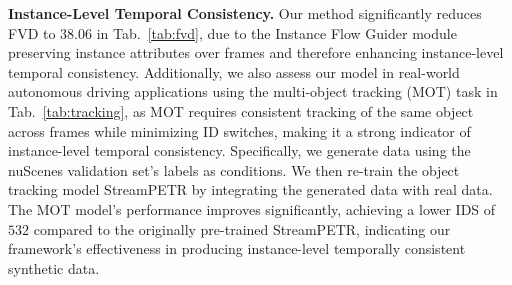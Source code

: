 \noindent\textbf{Instance-Level Temporal Consistency.} 
Our method significantly reduces FVD to $38.06$ in Tab.~\ref{tab:fvd}, due to the Instance Flow Guider module preserving instance attributes over frames and therefore enhancing instance-level temporal consistency.
Additionally, we also assess our model in real-world autonomous driving applications using the multi-object tracking (MOT) task in Tab.~\ref{tab:tracking}, 
as MOT requires consistent tracking of the same object across frames while minimizing ID switches, making it a strong indicator of instance-level temporal consistency.
Specifically, we generate data using the nuScenes validation set’s labels as conditions. 
We then re-train the object tracking model StreamPETR \cite{streampetr} by integrating the generated data with real data.
The MOT model's performance improves significantly, achieving a lower IDS of $532$ compared to the originally pre-trained StreamPETR, indicating %
our framework’s effectiveness in producing instance-level temporally consistent synthetic data.



\begin{table}[htbp]
    \centering
    \footnotesize
        \centering
         \caption{
         Comparison on perception task using the generated nuScenes validation set in (T+I)2V scenarios.
We use pre-trained perception model StreamPETR \cite{streampetr} to evaluate. 
Our model outperformed most baseline models across the board without any post-refine process, underscoring a better capability of spatial localization and occlusion hierarchy understanding.
         }
        \label{tab:perception}
\end{table}




